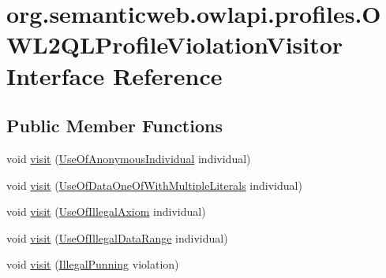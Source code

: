 \hypertarget{interfaceorg_1_1semanticweb_1_1owlapi_1_1profiles_1_1_o_w_l2_q_l_profile_violation_visitor}{\section{org.\-semanticweb.\-owlapi.\-profiles.\-O\-W\-L2\-Q\-L\-Profile\-Violation\-Visitor Interface Reference}
\label{interfaceorg_1_1semanticweb_1_1owlapi_1_1profiles_1_1_o_w_l2_q_l_profile_violation_visitor}
}
\subsection*{Public Member Functions}
\begin{DoxyCompactItemize}
\item 
void \hyperlink{interfaceorg_1_1semanticweb_1_1owlapi_1_1profiles_1_1_o_w_l2_q_l_profile_violation_visitor_aa0a8ac456e58bb02b1e42f8c96a95392}{visit} (\hyperlink{classorg_1_1semanticweb_1_1owlapi_1_1profiles_1_1_use_of_anonymous_individual}{Use\-Of\-Anonymous\-Individual} individual)
\item 
void \hyperlink{interfaceorg_1_1semanticweb_1_1owlapi_1_1profiles_1_1_o_w_l2_q_l_profile_violation_visitor_abc7c0817ec9a7f55b6521a1ae01aadc0}{visit} (\hyperlink{classorg_1_1semanticweb_1_1owlapi_1_1profiles_1_1_use_of_data_one_of_with_multiple_literals}{Use\-Of\-Data\-One\-Of\-With\-Multiple\-Literals} individual)
\item 
void \hyperlink{interfaceorg_1_1semanticweb_1_1owlapi_1_1profiles_1_1_o_w_l2_q_l_profile_violation_visitor_a80c3dc850157953ee83c469fdd43ac59}{visit} (\hyperlink{classorg_1_1semanticweb_1_1owlapi_1_1profiles_1_1_use_of_illegal_axiom}{Use\-Of\-Illegal\-Axiom} individual)
\item 
void \hyperlink{interfaceorg_1_1semanticweb_1_1owlapi_1_1profiles_1_1_o_w_l2_q_l_profile_violation_visitor_aa02540c4787769cf9bb78a7fd0073c95}{visit} (\hyperlink{classorg_1_1semanticweb_1_1owlapi_1_1profiles_1_1_use_of_illegal_data_range}{Use\-Of\-Illegal\-Data\-Range} individual)
\item 
void \hyperlink{interfaceorg_1_1semanticweb_1_1owlapi_1_1profiles_1_1_o_w_l2_q_l_profile_violation_visitor_a67f688804f4ee8bebe8d0240623a4adc}{visit} (\hyperlink{classorg_1_1semanticweb_1_1owlapi_1_1profiles_1_1_illegal_punning}{Illegal\-Punning} violation)
\item 

\end{DoxyCompactItemize}
